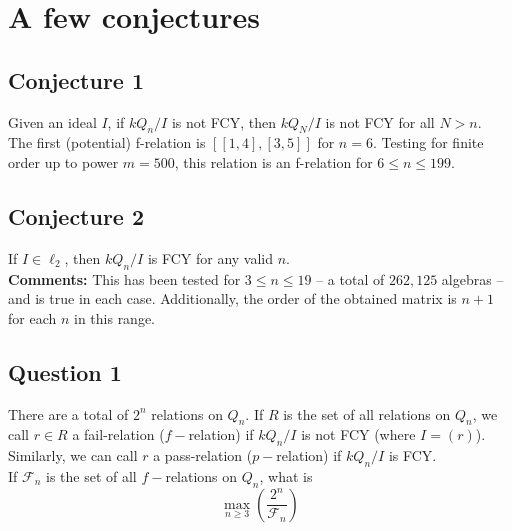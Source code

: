\documentclass{article}
\begin{document}
\begin{flushleft}
\begin{center}
   \end{center}
   \section{A few conjectures}
   \subsection*{Conjecture 1}
   Given an ideal $I$, if $kQ_n/I$ is not FCY, then $kQ_N/I$ is not FCY for all $N > n$. \\[\baselineskip]

   The first (potential) f-relation is $\left[[1,4], [3,5]\right]$ for $n=6$. Testing for finite order up to power $m = 500$, this
   relation is an f-relation for $6 \leq n \leq 199$.

   \subsection*{Conjecture 2}
   If $I \in \ell_2$, then $kQ_n / I$ is FCY for any valid $n$. \\[\baselineskip]
   \textbf{Comments:} This has been tested for $3 \leq n \leq 19$ -- a total of $262,125$ algebras -- and is true in each case.
   Additionally, the order of the obtained matrix is $n+1$ for each $n$ in this range.

   \subsection*{Question 1}
   There are a total of $2^n$ relations on $Q_n$. If $R$ is the set of all relations on $Q_n$, we call $r \in R$ a fail-relation ($f-$relation)
   if $kQ_n/I$ is not FCY (where $I = (r)$). Similarly, we can call $r$ a pass-relation ($p-$relation) if $kQ_n/I$ is FCY. \\[\baselineskip]

   If $\mathcal{F}_n$ is the set of all $f-$relations on $Q_n$, what is 
   \[
      \max_{n \geq 3} \left(\dfrac{2^n}{\mathcal{F}_n}\right)
   \]
\end{flushleft}

\iffalse
\begin{algorithm}
   \begin{algorithmic}[1]
      \caption{Determining the projectives and injectives.}
      \Require $R = [(s_1, t_1), (s_2, t_2), \ldots, (s_m, t_m)]$ \Comment{A list of $m$ relations on $Q_n$}.
      \State $P, I \gets \big[[1, \ldots, n],\; [2, \ldots, n],\; \ldots, [n]\big]$ \Comment{These lists store the projectives and injectives.}
      \For{$r \in R$}
      \For{$r[1] \leq v \leq n$} 
      \State Delete every element $1 \leq e \leq r[0]$ from $P[v]$. \Comment{Projectives.}
      \EndFor

      \For{$1 \leq v \leq r[0]$} 
      \State Delete every element $r[1] \leq e \leq n$ from $I[v]$. \Comment{Injectives.}
      \EndFor
      \EndFor
   \end{algorithmic}
\end{algorithm}
\fi
\end{document}

